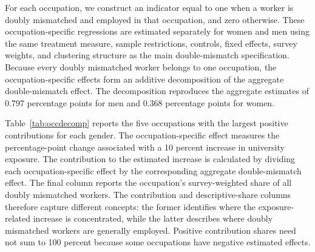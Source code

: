For each occupation, we construct an indicator equal to one when a worker is doubly mismatched and employed in that occupation, and zero otherwise. These occupation-specific regressions are estimated separately for women and men using the same treatment measure, sample restrictions, controls, fixed effects, survey weights, and clustering structure as the main double-mismatch specification. Because every doubly mismatched worker belongs to one occupation, the occupation-specific effects form an additive decomposition of the aggregate double-mismatch effect. The decomposition reproduces the aggregate estimates of 0.797 percentage points for men and 0.368 percentage points for women.

Table~\ref{tab:occdecomp} reports the five occupations with the largest positive contributions for each gender. The occupation-specific effect measures the percentage-point change associated with a 10 percent increase in university exposure. The contribution to the estimated increase is calculated by dividing each occupation-specific effect by the corresponding aggregate double-mismatch effect. The final column reports the occupation's survey-weighted share of all doubly mismatched workers. The contribution and descriptive-share columns therefore capture different concepts: the former identifies where the exposure-related increase is concentrated, while the latter describes where doubly mismatched workers are generally employed. Positive contribution shares need not sum to 100 percent because some occupations have negative estimated effects.

